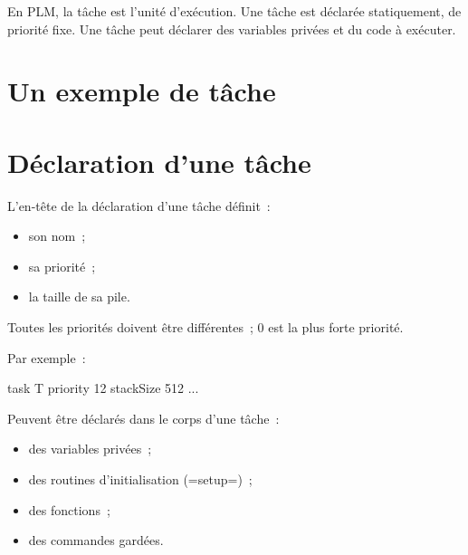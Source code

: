 





En PLM, la tâche est l'unité d'exécution. Une tâche est déclarée statiquement, de priorité fixe. Une tâche peut déclarer des variables privées et du code à exécuter.


\section{Un exemple de tâche}



\section{Déclaration d'une tâche}

L'en-tête de la déclaration d'une tâche définit~:
\begin{itemize}
  \item son nom~;
  \item sa priorité~;
  \item la taille de sa pile.
\end{itemize}

Toutes les priorités doivent être différentes~; $0$ est la plus forte priorité.

Par exemple~:
\begin{PLM}
task T priority 12 stackSize 512 {
  ...
}
\end{PLM}

Peuvent être déclarés dans le corps d'une tâche~:
\begin{itemize}
  \item des variables privées~;
  \item des routines d'initialisation (\plm=setup=)~;
  \item des fonctions~;
  \item des commandes gardées.
\end{itemize}

